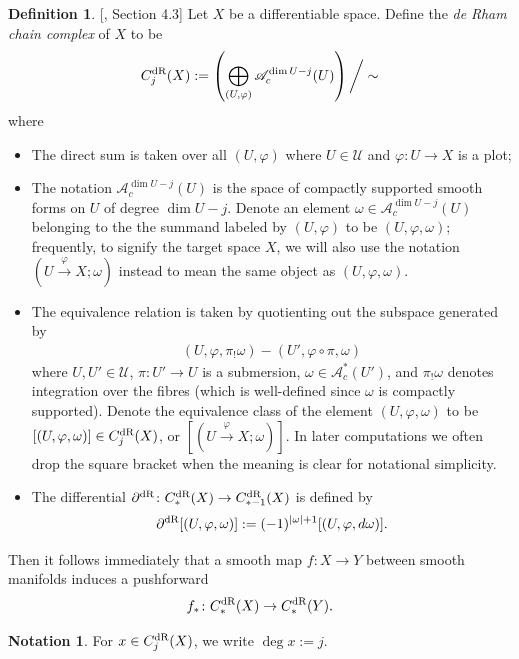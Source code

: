 \documentclass[10pt]{amsart}
\numberwithin{equation}{section}
\theoremstyle{plain}
\theoremstyle{definition}
\newtheorem{definition}[theorem]{Definition}
\newtheorem{notation}[theorem]{Notation}
\theoremstyle{remark}
\numberwithin{equation}{section}
\newcommand{\dR}{\textup{dR}}
\begin{document}
{\begin{definition}\label{Defn: dRchainCplx}[\cite{Irie1}, Section 4.3]
	Let $X$ be a differentiable space. Define the \emph{de Rham chain complex} of $X$ to be
	\[ C_j^\dR(X):= \left(\bigoplus_{(U,\varphi)} \mathscr{A}_c^{\dim U-j}(U)\right)\bigg/ \sim\]
where 
\begin{itemize}
	\item The direct sum is taken over all $(U,\varphi)$ where $U\in \mathscr{U}$ and $\varphi\colon U\to X$ is a plot;
	\item The notation $\mathscr{A}_c^{\dim U-j}(U)$ is the space of compactly supported smooth forms on $U$ of degree $\dim U-j$. Denote an element $\omega\in \mathscr{A}_c^{\dim U-j}(U)$ belonging to the the summand labeled by $(U,\varphi)$ to be $(U,\varphi,\omega)$; frequently, to signify the target space $X$, we will also use the notation $(U\xrightarrow{\varphi} X; \omega)$ instead to mean the same object as $(U,\varphi,\omega)$.
	\item The equivalence relation is taken by quotienting out the subspace generated by \begin{align}\label{Eq: dRChainRelation}(U,\varphi, \pi_!\omega)- (U',\varphi\circ \pi, \omega)\end{align}
	where $U,U'\in \mathscr{U}$, $\pi\colon U'\to U$ is a submersion, $\omega \in \mathscr{A}_c^*(U')$, and $\pi_!\omega$ denotes integration over the fibres (which is well-defined since $\omega$ is compactly supported).
	Denote the equivalence class of the element $(U,\varphi, \omega)$  to be $[(U,\varphi, \omega)]\in C_j^\dR(X)$, or $[(U\xrightarrow{\varphi}X;\omega)]$. In later computations we often drop the square bracket when the meaning is clear for notational simplicity.
	\item The differential $\partial^\dR \colon C_*^\dR(X)\to C_{*-1}^\dR(X)$ is defined by \begin{equation}\label{Eq: DefnPartialDR}\partial^\dR [(U,\varphi, \omega)]:= (-1)^{|\omega|+1}[(U,\varphi, d\omega)].\end{equation}
\end{itemize}
\end{definition}



Then it follows immediately that a smooth map $f\colon X\to Y$ between smooth manifolds induces a pushforward \[ f_*\colon C_*^\dR(X)\to C_*^\dR(Y).\]


\begin{notation}\label{Ntn: degx}
For $x\in C_j^\dR(X)$, we write $\deg x:= j$.	
\end{notation}

}
\end{document}
